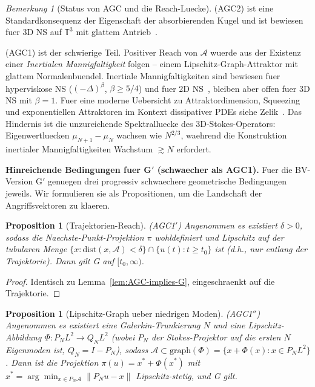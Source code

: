 \documentclass[12pt,a4paper]{article}
\theoremstyle{definition}
\theoremstyle{plain}
\newtheorem{proposition}[definition]{Proposition}
\theoremstyle{remark}
\newtheorem{remark}[definition]{Bemerkung}
\begin{document}
\begin{remark}[Status von AGC und die Reach-Luecke]
\label{rem:AGC-status}
\textup{(AGC2)} ist eine Standardkonsequenz der Eigenschaft der absorbierenden Kugel
und ist bewiesen fuer 3D NS auf $\mathbb{T}^3$ mit glattem
Antrieb~\cite{Temam2001}.

\textup{(AGC1)} ist der schwierige Teil.
Positiver Reach von $\mathcal{A}$ wuerde aus der Existenz einer
\emph{Inertialen Mannigfaltigkeit} folgen -- einem Lipschitz-Graph-Attraktor mit glattem
Normalenbuendel. Inertiale Mannigfaltigkeiten sind bewiesen fuer hyperviskose NS
($(-\Delta)^\beta$, $\beta \ge 5/4$) und fuer 2D
NS~\cite{MalletParetSell1988,EdenFoiasNicolaenko1994}, bleiben aber offen fuer 3D NS mit $\beta=1$.
Fuer eine moderne Uebersicht zu Attraktordimension, Squeezing und exponentiellen
Attraktoren im Kontext dissipativer PDEs siehe Zelik~\cite{Zelik2022}.
Das Hindernis ist die unzureichende Spektralluecke des 3D-Stokes-Operators:
Eigenwertluecken $\mu_{N+1} - \mu_N$ wachsen wie $N^{2/3}$, waehrend
die Konstruktion inertialer Mannigfaltigkeiten Wachstum $\gtrsim N$ erfordert.

\medskip\noindent
\textbf{Hinreichende Bedingungen fuer G$'$ (schwaecher als AGC1).}\;
Fuer die BV-Version G$'$ genuegen drei progressiv schwaechere geometrische
Bedingungen jeweils. Wir formulieren sie als Propositionen, um die
Landschaft der Angriffsvektoren zu klaeren.

\begin{proposition}[Trajektorien-Reach]\label{prop:traj-reach}
\textup{(AGC1$'$)}\;
Angenommen es existiert $\delta > 0$, sodass die Naechste-Punkt-Projektion
$\pi$ wohldefiniert und Lipschitz auf der tubularen Menge
$\{x : \mathrm{dist}(x, \mathcal{A}) < \delta\}
\cap \{u(t) : t \ge t_0\}$
ist \textup{(}d.h., nur entlang der Trajektorie\textup{)}. Dann gilt G
auf $[t_0, \infty)$.
\end{proposition}

\begin{proof}
Identisch zu Lemma~\ref{lem:AGC-implies-G}, eingeschraenkt auf die
Trajektorie.
\end{proof}

\begin{proposition}[Lipschitz-Graph ueber niedrigen Moden]\label{prop:graph}
\textup{(AGC1$''$)}\;
Angenommen es existiert eine Galerkin-Trunkierung $N$ und eine Lipschitz-Abbildung
$\Phi : P_N L^2 \to Q_N L^2$ (wobei $P_N$ der Stokes-Projektor
auf die ersten $N$ Eigenmoden ist, $Q_N = I - P_N$), sodass
$\mathcal{A} \subset \mathrm{graph}(\Phi) =
\{x + \Phi(x) : x \in P_N L^2\}$.
Dann ist die Projektion $\pi(u) = x^* + \Phi(x^*)$ mit
$x^* = \arg\min_{x \in P_N\mathcal{A}} \|P_N u - x\|$ Lipschitz-stetig,
und G gilt.
\end{proposition}


\end{remark}
\end{document}
